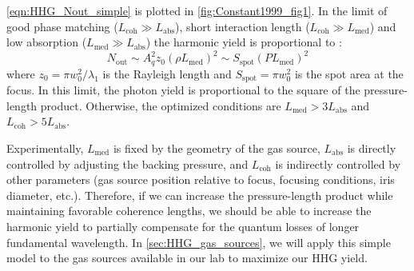 \cref{eqn:HHG_Nout_simple} is plotted in \cref{fig:Constant1999_fig1}. In the limit of good phase matching ($L_{\textrm{coh}} \gg L_{\textrm{abs}}$), short interaction length ($L_{\textrm{coh}} \gg L_{\textrm{med}}$) and low absorption ($L_{\textrm{med}} \gg L_{\textrm{abs}}$) the harmonic yield is proportional to \cite{takahashiGenerationStrongOptical2004}:
\begin{equation}
N_{\textrm{out}} \sim A_q^2 z_0 (\rho L_{\textrm{med}})^2 \sim S_{\textrm{spot}} (P L_{\textrm{med}})^2
\label{eqn:HHG_Nout_2}
\end{equation}
where $z_0 = \pi w_0^2 / \lambda_1$ is the Rayleigh length and $S_{\textrm{spot}} = \pi w_0^2$ is the spot area at the focus. In this limit, the photon yield is proportional to the square of the pressure-length product. Otherwise, the optimized conditions are $L_{\textrm{med}} > 3 L_{\textrm{abs}}$ and $L_{\textrm{coh}} > 5 L_{\textrm{abs}}$.


Experimentally, $L_{\textrm{med}}$ is fixed by the geometry of the gas source, $L_{\textrm{abs}}$ is directly controlled by adjusting the backing pressure, and $L_{\textrm{coh}}$ is indirectly controlled by other parameters (gas source position relative to focus, focusing conditions, iris diameter, etc.). Therefore, if we can increase the pressure-length product while maintaining favorable coherence lengths, we should be able to increase the harmonic yield to partially compensate for the quantum losses of longer fundamental wavelength. In \cref{sec:HHG_gas_sources}, we will apply this simple model to the gas sources available in our lab to maximize our HHG yield.

%
%

